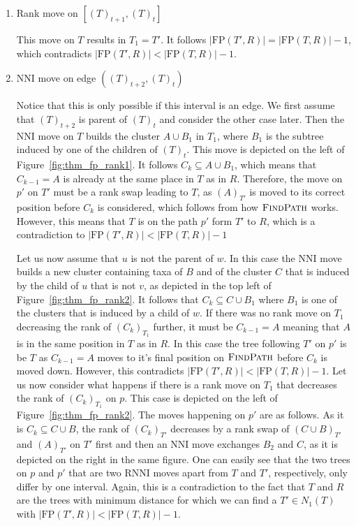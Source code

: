 \documentclass{amsart}
\newcommand{\rnni}{\mathrm{RNNI}}
\newcommand{\findpath}{\textsc{FindPath}}
\newcommand{\nni}{\mathrm{NNI}}
\newcommand{\fp}{\mathrm{FP}}
\begin{document}
\begin{enumerate}[label = 2.\arabic*]
\item Rank move on $[(T)_{t+1},(T)_t]$

This move on $T$ results in $T_1 = T'$.
It follows $|\fp(T',R)| = |\fp(T,R)| - 1$, which contradicts $|\fp(T',R)| < |\fp(T,R)| - 1$.

\item $\nni$ move on edge $((T)_{t+2},(T)_{t})$

Notice that this is only possible if this interval is an edge.
We first assume that $(T)_{t+2}$ is parent of $(T)_t$ and consider the other case later.
Then the $\nni$ move on $T$ builds the cluster $A \cup B_1$ in $T_1$, where $B_1$ is the subtree induced by one of the children of $(T)_t$.
This move is depicted on the left of Figure~\ref{fig:thm_fp_rank1}.
It follows $C_k \subseteq A \cup B_1$, which means that $C_{k-1} = A$
 is already at the same place in $T$ as in $R$.
Therefore, the move on $p'$ on $T'$ must be a rank swap leading to $T$, as $(A)_{T'}$ is moved to its correct position before $C_k$ is considered, which follows from how $\findpath$ works.
However, this means that $T$ is on the path $p'$ form $T'$ to $R$, which is a contradiction to $|\fp(T',R)| < |\fp(T,R)| - 1$

Let us now assume that $u$ is not the parent of $w$.
In this case the $\nni$ move builds a new cluster containing taxa of $B$ and of the cluster $C$ that is induced by the child of $u$ that is not $v$, as depicted in the top left of Figure~\ref{fig:thm_fp_rank2}.
It follows that $C_k \subseteq C \cup B_1$ where $B_1$ is one of the clusters that is induced by a child of $w$.
If there was no rank move on $T_1$ decreasing the rank of $(C_k)_{T_1}$ further, it must be $C_{k-1} = A$ meaning that $A$ is in the same position in $T$ as in $R$.
In this case the tree following $T'$ on $p'$ is be $T$ as $C_{k-1} = A$ moves to it's final position on $\findpath$ before $C_k$ is moved down.
However, this contradicts $|\fp(T',R)| < |\fp(T,R)| - 1$.
Let us now consider what happens if there is a rank move on $T_1$ that decreases the rank of $(C_k)_{T_1}$ on $p$.
This case is depicted on the left of Figure~\ref{fig:thm_fp_rank2}.
The moves happening on $p'$ are as follows.
As it is $C_k \subseteq C \cup B$, the rank of $(C_k)_{T'}$ decreases by a rank swap of $(C \cup B)_{T'}$ and $(A)_{T'}$ on $T'$ first and then an $\nni$ move exchanges $B_2$ and $C$, as it is depicted on the right in the same figure.
One can easily see that the two trees on $p$ and $p'$ that are two $\rnni$ moves apart from $T$ and $T'$, respectively, only differ by one interval.
Again, this is a contradiction to the fact that $T$ and $R$ are the trees with minimum distance for which we can find a $T' \in N_1(T)$ with $|\fp(T',R)| < |\fp(T,R)| - 1$.


\end{enumerate}
\end{document}
